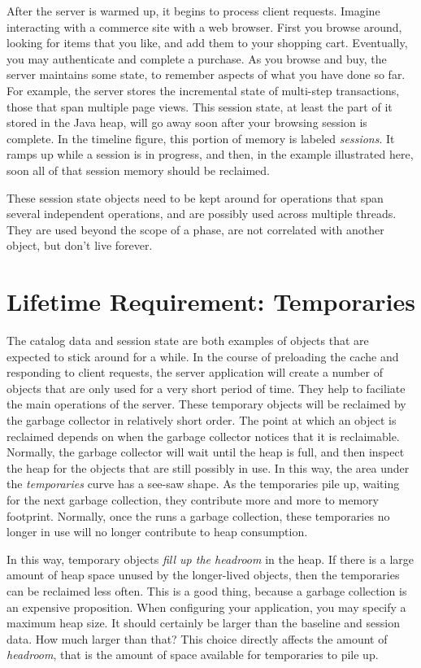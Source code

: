 After the server is warmed up, it begins to process client requests. Imagine
interacting with a commerce site with a web browser. First you browse around,
looking for items that you like, and add them to your shopping cart. Eventually,
you may authenticate and complete a purchase. As you browse and buy, the server
maintains some state, to remember aspects of what you have done so far. For
example, the server stores the incremental state of multi-step transactions,
those that span multiple page views. This session state, at least the part of it
stored in the Java heap, will go away soon after your browsing session is
complete. In the timeline figure, this portion of memory is labeled
\emph{sessions}. It ramps up while a session is in progress, and then, in the
example illustrated here, soon all of that session memory should be reclaimed.

These session state objects need to be kept around for operations that span
several independent operations, and are possibly used across multiple threads.
They are used beyond the scope of a phase, are not correlated with another
object, but don't live forever.


\section{Lifetime Requirement: Temporaries}
\label{sec:temporary-lifetime}

The catalog data and session state are both examples of objects that are expected
to stick around for a while. In the course of preloading the cache and responding
to client requests, the server application will create a number of objects that
are only used for a very short period of time.
They help to faciliate the main
operations of the server. These temporary objects will be reclaimed by the \jres
garbage collector in relatively short order. The point at which an object is
reclaimed depends on when the garbage collector notices that it is reclaimable.
Normally, the garbage collector will wait until the heap is full, and then
inspect the heap for the objects that are still possibly in use. In this way, the
area under the \emph{temporaries} curve has a see-saw shape. As the temporaries
pile up, waiting for the next garbage collection, they contribute more and more
to memory footprint. Normally, once the \jre runs a garbage collection, these
temporaries no longer in use will no longer contribute to heap consumption.

In this way, temporary objects
\emph{fill up the headroom} in the heap. If there is a
large amount of heap space unused by the longer-lived objects, then the
temporaries can be reclaimed less often. This is a good thing, because a
garbage collection is an expensive proposition.
   When configuring your application, you may specify a maximum heap size.
It should certainly be larger than the baseline and session data. How much
larger than that? This choice directly affects the amount of \emph{headroom},
 that is the amount of space available for temporaries to pile up.

